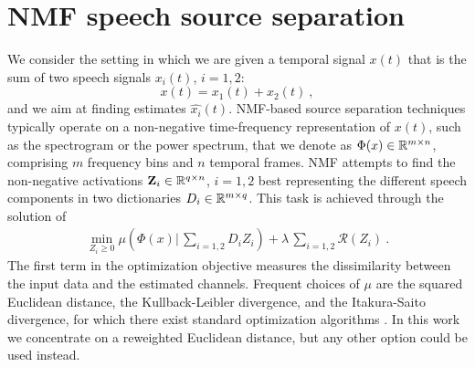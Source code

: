 \section{NMF speech source separation}
\label{nmfsec}

%
We consider the setting in which we are given a temporal signal $x(t)$ that is the sum of  
two speech signals $x_i(t)$, $i=1,2$:
\begin{equation}
\label{ssep}
x(t) = x_1(t) + x_2(t)~,
\end{equation}
and we aim at finding estimates $\widehat{x_i}(t)$.
NMF-based source separation 
techniques typically operate on a non-negative time-frequency representation of $x(t)$, 
such as the spectrogram or the power spectrum,
that we denote as $\Phi(x) \in \mathbb{R}^{m \times n}$, comprising $m$ frequency bins and $n$ temporal frames. 
NMF attempts to find the non-negative activations $\bm{\mathrm{Z}}_i \in \mathbb{R}^{q \times n}$, $i=1,2$ 
best representing the different speech components in two dictionaries ${D}_{i} \in \mathbb{R}^{m \times q}$.
%
This task is achieved through the solution of %
\begin{eqnarray}
\label{eq:optim_general}
\min_{ Z_i \ge 0 } \mu( \Phi(x) |  \, \sum_{i=1,2} {D}_i Z_i  ) + 
\lambda\, \sum_{i=1,2} \mathcal{R}(Z_i)~.
\end{eqnarray}
The first term in the optimization objective measures the dissimilarity between the input data and the estimated channels. 
Frequent choices of $\mu$ are the squared Euclidean distance,
the Kullback-Leibler divergence, and the Itakura-Saito divergence, for which there exist standard optimization algorithms \cite{fevotte2011algorithms}.
In this work we concentrate on a reweighted Euclidean distance, but any other option could be used instead.
%
